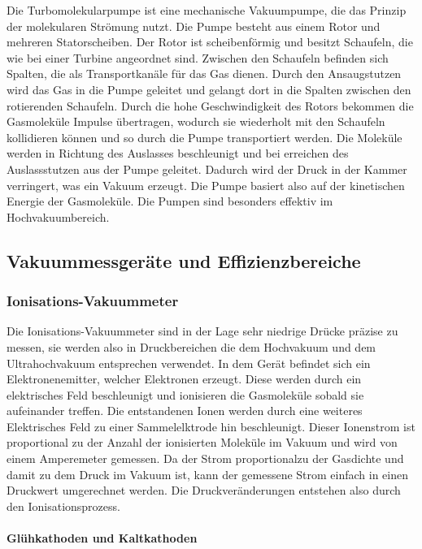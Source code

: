 Die Turbomolekularpumpe ist eine mechanische Vakuumpumpe, die das Prinzip der molekularen Strömung nutzt.
Die Pumpe besteht aus einem Rotor und mehreren Statorscheiben. Der Rotor ist scheibenförmig und besitzt Schaufeln, die wie bei einer Turbine angeordnet sind.
Zwischen den Schaufeln befinden sich Spalten, die als Transportkanäle für das Gas dienen.
Durch den Ansaugstutzen wird das Gas in die Pumpe geleitet und gelangt dort in die Spalten zwischen den rotierenden Schaufeln. Durch die
hohe Geschwindigkeit des Rotors bekommen die Gasmoleküle Impulse übertragen, wodurch sie wiederholt mit den Schaufeln kollidieren können und so durch
die Pumpe transportiert werden. Die Moleküle werden in Richtung des Auslasses beschleunigt und bei erreichen des Auslassstutzen aus der Pumpe geleitet.
Dadurch wird der Druck in der Kammer verringert, was ein Vakuum erzeugt.
Die Pumpe basiert also auf der kinetischen Energie der Gasmoleküle. Die Pumpen sind besonders effektiv im Hochvakuumbereich.


\subsection{Vakuummessgeräte und Effizienzbereiche}
\subsubsection{Ionisations-Vakuummeter}
Die Ionisations-Vakuummeter sind in der Lage sehr niedrige Drücke präzise zu messen, sie werden also in Druckbereichen die dem Hochvakuum 
und dem Ultrahochvakuum entsprechen verwendet. In dem Gerät befindet sich ein Elektronenemitter, welcher Elektronen erzeugt. Diese
werden durch ein elektrisches Feld beschleunigt und ionisieren die Gasmoleküle sobald sie aufeinander treffen. Die entstandenen Ionen werden durch eine 
weiteres Elektrisches Feld zu einer Sammelelktrode hin beschleunigt. Dieser Ionenstrom ist proportional zu der Anzahl der ionisierten Moleküle im Vakuum und 
wird von einem Amperemeter gemessen. Da der Strom proportionalzu der Gasdichte und damit zu dem Druck im Vakuum ist, kann der gemessene Strom einfach in einen 
Druckwert umgerechnet werden. Die Druckveränderungen entstehen also durch den Ionisationsprozess.


\paragraph{Glühkathoden und Kaltkathoden}

